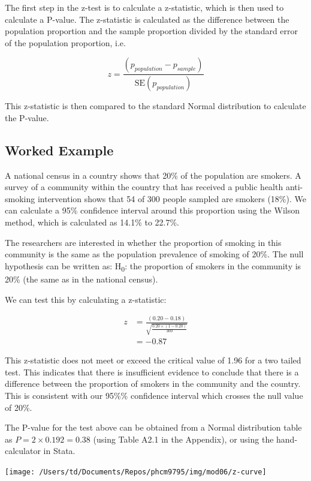 \documentclass[
]{memoir}
\begin{document}
The first step in the z-test is to calculate a z-statistic, which is then used to calculate a P-value. The z-statistic is calculated as the difference between the population proportion and the sample proportion divided by the standard error of the population proportion, i.e.

\[
z = \frac{(p_{population} - p_{sample})}{\text{SE}(p_{population})}
\]

This z-statistic is then compared to the standard Normal distribution to calculate the P-value.

\hypertarget{z-prop-example}{%
\subsection{Worked Example}\label{z-prop-example}}

A national census in a country shows that 20\% of the population are smokers. A survey of a community within the country that has received a public health anti-smoking intervention shows that 54 of 300 people sampled are smokers (18\%). We can calculate a 95\% confidence interval around this proportion using the Wilson method, which is calculated as 14.1\% to 22.7\%.

The researchers are interested in whether the proportion of smoking in this community is the same as the population prevalence of smoking of 20\%. The null hypothesis can be written as: H\textsubscript{0}: the proportion of smokers in the community is 20\% (the same as in the national census).

We can test this by calculating a z-statistic:

\[
\begin{aligned}
z &= \frac{(0.20 - 0.18)}{\sqrt{\frac{0.20 × (1 - 0.20)}{300}}} \\
 &= -0.87
\end{aligned}
\]

This z-statistic does not meet or exceed the critical value of 1.96 for a two tailed test. This indicates that there is insufficient evidence to conclude that there is a difference between the proportion of smokers in the community and the country. This is consistent with our 95\%\% confidence interval which crosses the null value of 20\%.

The P-value for the test above can be obtained from a Normal distribution table as \(P = 2 × 0.192 = 0.38\) (using Table A2.1 in the Appendix), or using the hand-calculator in Stata.

\texttt{[image: /Users/td/Documents/Repos/phcm9795/img/mod06/z-curve]}
\end{document}

